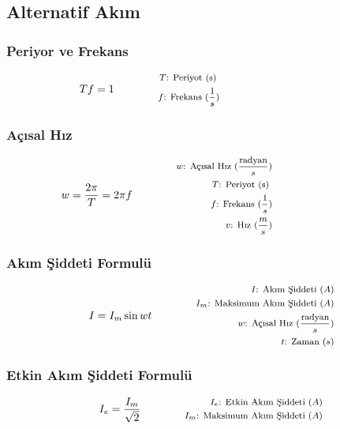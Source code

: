 \subsection{Alternatif Akım}

\subsubsection*{Periyor ve Frekans}
\begin{equation}
    Tf = 1 \qquad \qquad \parbox{5.5cm}{\footnotesize$\begin{aligned}
        T\text{: Periyot (s) } \\
        f\text{: Frekans } (\frac{1}{s})
\end{aligned}$}
\end{equation}

\subsubsection*{Açısal Hız}
\begin{equation}
    w  = \frac{2\pi}{T} = 2 \pi f \qquad \qquad \parbox{5.5cm}{\footnotesize$\begin{aligned}
        w\text{: Açısal Hız } (\frac{\text{radyan}}{s}) \\
        T\text{: Periyot (s) } \\
        f\text{: Frekans } (\frac{1}{s}) \\
        v\text{: Hız } (\frac{m}{s})
\end{aligned}$}
\end{equation}

\subsubsection*{Akım Şiddeti Formulü}
\begin{equation}
    I = I_{m} \sin{wt} \qquad \qquad \parbox{4cm}{\footnotesize$\begin{aligned}
        I\text{: Akım Şiddeti } (A) \\
        I_m\text{: Maksimum Akım Şiddeti } (A) \\
        w\text{: Açısal Hız } (\frac{\text{radyan}}{s}) \\
        t\text{: Zaman } (s)
\end{aligned}$}
\end{equation}

\subsubsection*{Etkin Akım Şiddeti Formulü}
\begin{equation}
    I_e = \frac{I_{m}}{\sqrt 2} \qquad \qquad \parbox{4cm}{\footnotesize$\begin{aligned}
        I_e\text{: Etkin Akım Şiddeti } (A) \\
        I_m\text{: Maksimum Akım Şiddeti } (A)
\end{aligned}$}
\end{equation}

